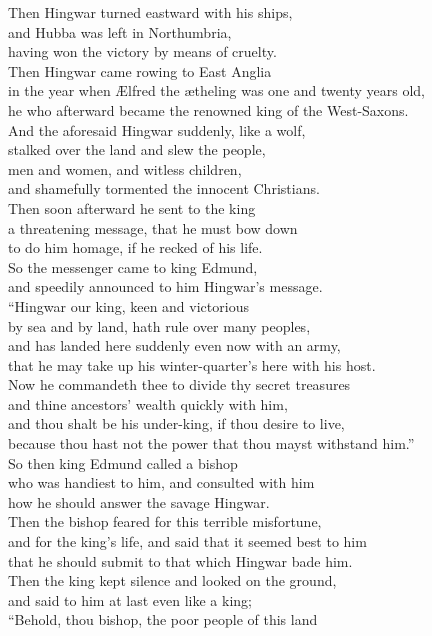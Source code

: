 \documentclass[10pt]{book}
\begin{document}
\begin{center}
\parbox{\pagelen}{
Then Hingwar turned eastward with his ships, \\
and Hubba was left in Northumbria, \\
having won the victory by means of cruelty. \\
Then Hingwar came rowing to East Anglia \\
in the year when \AE{}lfred the \ae{}theling was one and twenty years old, \\
he who afterward became the renowned king of the West-Saxons. \\
And the aforesaid Hingwar suddenly, like a wolf,  \\
stalked over the land and slew the people, \\
men and women, and witless children, \\
and shamefully tormented the innocent Christians. \\
Then soon afterward he sent to the king \\
a threatening message, that he must bow down \\
to do him homage, if he recked of his life. \\
So the messenger came to king Edmund, \\
and speedily announced to him Hingwar's message. \\
``Hingwar our king, keen and victorious \\
by sea and by land, hath rule over many peoples, \\
and has landed here suddenly even now with an army, \\
that he may take up his winter-quarter's here with his host. \\
Now he commandeth thee to divide thy secret treasures  \\
and thine ancestors' wealth quickly with him, \\
and thou shalt be his under-king, if thou desire to live, \\
because thou hast not the power that thou mayst withstand him.'' \\
So then king Edmund called a bishop  \\
who was handiest to him, and consulted with him \\
how he should answer the savage Hingwar. \\
Then the bishop feared for this terrible misfortune, \\
and for the king's life, and said that it seemed best to him \\
that he should submit to that which Hingwar bade him. \\
Then the king kept silence and looked on the ground, \\
and said to him at last even like a king; \\
``Behold, thou bishop, the poor people of this land \\
}
\end{center}
\end{document}
